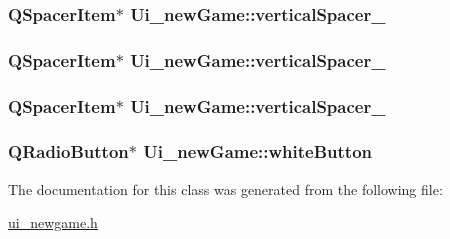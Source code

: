 \hypertarget{classUi__newGame_a06a2895bbb196b985b0b2e2ab4f497e3}{
\subsubsection[{vertical\-Spacer\-\_\-5}]{\setlength{\rightskip}{0pt plus 5cm}Q\-Spacer\-Item$\ast$ Ui\-\_\-new\-Game\-::vertical\-Spacer\-\_}}\label{classUi__newGame_a06a2895bbb196b985b0b2e2ab4f497e3}
\hypertarget{classUi__newGame_a5946e4c83533cb09dbff3dcc02667365}{
\subsubsection[{vertical\-Spacer\-\_\-6}]{\setlength{\rightskip}{0pt plus 5cm}Q\-Spacer\-Item$\ast$ Ui\-\_\-new\-Game\-::vertical\-Spacer\-\_}}\label{classUi__newGame_a5946e4c83533cb09dbff3dcc02667365}
\hypertarget{classUi__newGame_a1d57e197dfab5615dd19cf28da670024}{
\subsubsection[{vertical\-Spacer\-\_\-7}]{\setlength{\rightskip}{0pt plus 5cm}Q\-Spacer\-Item$\ast$ Ui\-\_\-new\-Game\-::vertical\-Spacer\-\_}}\label{classUi__newGame_a1d57e197dfab5615dd19cf28da670024}
\hypertarget{classUi__newGame_ae37b86898ab8dc3227368498fb85beb9}{
\subsubsection[{white\-Button}]{\setlength{\rightskip}{0pt plus 5cm}Q\-Radio\-Button$\ast$ Ui\-\_\-new\-Game\-::white\-Button}}\label{classUi__newGame_ae37b86898ab8dc3227368498fb85beb9}


The documentation for this class was generated from the following file\-:\begin{DoxyCompactItemize}
\item 
\hyperlink{ui__newgame_8h}{ui\-\_\-newgame.\-h}\end{DoxyCompactItemize}
